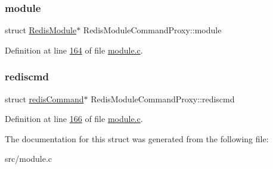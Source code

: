 \mbox{\label{structRedisModuleCommandProxy_ae3e52ba9a8324951e140feaf456d1492}} 
\subsubsection{\texorpdfstring{module}{module}}
{\footnotesize\ttfamily struct \hyperlink{structRedisModule}{Redis\+Module}$\ast$ Redis\+Module\+Command\+Proxy\+::module}



Definition at line \hyperlink{module_8c_source_l00164}{164} of file \hyperlink{module_8c_source}{module.\+c}.

\mbox{\label{structRedisModuleCommandProxy_a2cfd4df1e644aadb7a23d50b7f6ab6ef}} 
\subsubsection{\texorpdfstring{rediscmd}{rediscmd}}
{\footnotesize\ttfamily struct \hyperlink{structredisCommand}{redis\+Command}$\ast$ Redis\+Module\+Command\+Proxy\+::rediscmd}



Definition at line \hyperlink{module_8c_source_l00166}{166} of file \hyperlink{module_8c_source}{module.\+c}.



The documentation for this struct was generated from the following file\+:\begin{DoxyCompactItemize}
\item 
src/module.\+c\end{DoxyCompactItemize}
